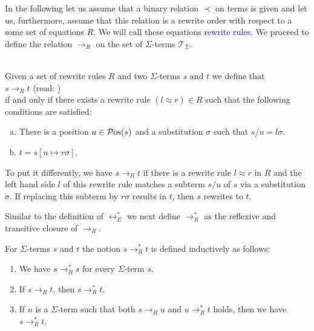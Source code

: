 In the following let us assume that a binary relation $\prec$ on terms is given and let us, furthermore, assume
that this relation is a rewrite order with respect to a some set of equations $R$.  We will call these equations
\textcolor{blue}{rewrite rules}.  We proceed to define the relation $\rightarrow_R$ on the set of $\Sigma$-terms $\mathcal{T}_\Sigma$. 

\begin{Definition} \hspace*{\fill} \\
  Given a set of rewrite rules $R$ and two $\Sigma$-terms $s$ and $t$ we define that
  \\[0.2cm]
  \hspace*{1.3cm}
  $s \rightarrow_R t$ \quad (read: )
  \\[0.2cm]
  if and only if there exists a rewrite rule $(l \approx r) \in R$ such that the following conditions are satisfied:
  \begin{enumerate}[(a)]
  \item There is a position $u \in \mathcal{P}\mathrm{os}(s)$ and a substitution $\sigma$ such that $s/u = l\sigma$.
  \item $t = s[u \mapsto r\sigma]$. \eox
  \end{enumerate}
\end{Definition}

To put it differently, we have $s \rightarrow_R t$ if there is a rewrite rule $l \approx r$ in $R$ and the left hand
side $l$ of this rewrite rule matches a subterm $s/u$ of $s$ via a substitution $\sigma$.  If replacing this
subterm by $r\sigma$ results in $t$, then $s$ rewrites to $t$.

Similar to the definition of $\leftrightarrow_E^*$  we next define $\rightarrow_R^*$ as the reflexive and transitive closure of $\rightarrow_R$.
\begin{Definition}[$\rightarrow_R^*$]
  For $\Sigma$-terms $s$ and $t$ the notion $s \rightarrow_R^* t$ is defined inductively as follows:
  \begin{enumerate}
  \item We have $s \rightarrow_R^* s$ for every $\Sigma$-term $s$.
  \item If $s \rightarrow_R t$, then $s \rightarrow_R^* t$.
  \item If $u$ is a $\Sigma$-term such that both $s \rightarrow_R u$ and $u \rightarrow_R^* t$ holds,
        then we have $s \rightarrow_R^* t$. \eod
  \end{enumerate}
\end{Definition}

